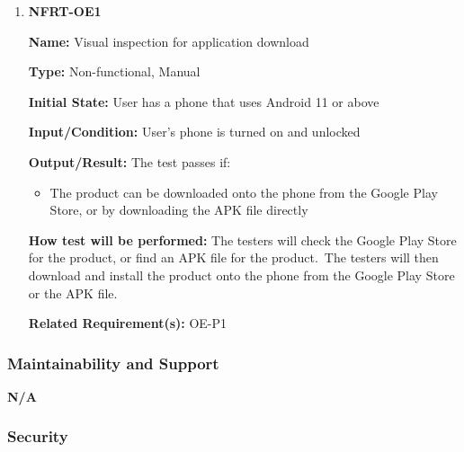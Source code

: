 \documentclass[12pt, titlepage]{article}
\begin{document}
\begin{enumerate}
\item{\textbf{NFRT-OE1}}

\textbf{Name:} Visual inspection for application download

\textbf{Type:} Non-functional, Manual

\textbf{Initial State:} User has a phone that uses Android 11 or above

\textbf{Input/Condition:} User's phone is turned on and unlocked

\textbf{Output/Result:} The test passes if:
\begin{itemize}
  \item The product can be downloaded onto the phone from the Google Play Store, or by downloading the APK file directly
\end{itemize}

\textbf{How test will be performed:} The testers will check the Google Play Store for the product, or find an APK file for the product.\
The testers will then download and install the product onto the phone from the Google Play Store or the APK file.

\textbf{Related Requirement(s):} OE-P1

\end{enumerate}

\subsubsection{Maintainability and Support}

\quad \textbf{N/A}

\subsubsection{Security}
\end{document}

